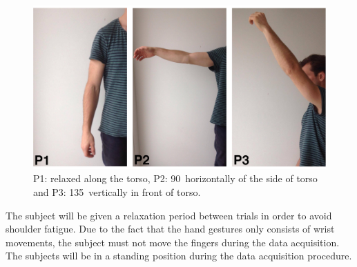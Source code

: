 \begin{figure}[H]                    
	\includegraphics[width=1\textwidth]{figures/protocol/limb_positions}  %
	\caption{P1: relaxed along the torso, P2: 90\textdegree \ horizontally of the side of torso and P3: 135\textdegree \ vertically in front of torso.}
	\label{fig:limb_positions}  %
\end{figure}

The subject will be given a relaxation period between trials in order to avoid shoulder fatigue.
Due to the fact that the hand gestures only consists of wrist movements, the subject must not move the fingers during the data acquisition.
The subjects will be in a standing position during the data acquisition procedure.

